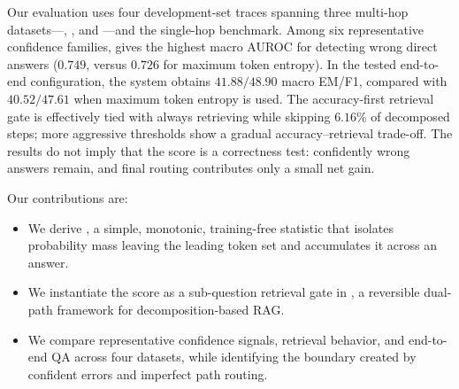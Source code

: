 Our evaluation uses four development-set traces spanning three multi-hop
datasets---\hotpot{}, \twowiki{}, and \musique{}---and the single-hop
\popqa{} benchmark. Among six representative confidence families,
\tailleak{} gives the highest macro AUROC for detecting wrong direct answers
(\(0.749\), versus \(0.726\) for maximum token entropy). In the tested
end-to-end configuration, the \tailleak{} system obtains \(41.88/48.90\)
macro EM/F1, compared with \(40.52/47.61\) when maximum token entropy is used.
The accuracy-first retrieval gate is effectively tied with always retrieving
while skipping \(6.16\%\) of decomposed steps; more aggressive thresholds show
a gradual accuracy--retrieval trade-off. The results do not imply that the
score is a correctness test: confidently wrong answers remain, and final
routing contributes only a small net gain.

Our contributions are:
\begin{itemize}
    \item We derive \tailleak{}, a simple, monotonic, training-free statistic
    that isolates probability mass leaving the leading token set and
    accumulates it across an answer.
    \item We instantiate the score as a sub-question retrieval gate in
    \method{}, a reversible dual-path framework for decomposition-based RAG.
    \item We compare representative confidence signals, retrieval behavior,
    and end-to-end QA across four datasets, while identifying the boundary
    created by confident errors and imperfect path routing.
\end{itemize}
